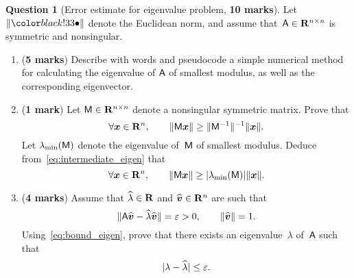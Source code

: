 \documentclass[11pt]{article}
\theoremstyle{definition}
\newtheorem{question}{Question}
\theoremstyle{remark}
\begin{document}


\newpage
\begin{question}
    [Error estimate for eigenvalue problem, \textbf{10 marks}]
    Let $\norm{\placeholder}$ denote the Euclidean norm,
    and assume that~$\mathsf A \in \mathbf R^{n \times n}$ is symmetric and nonsingular.

    \begin{enumerate}
        \item
            (\textbf{5 marks})
            Describe with words and pseudocode a simple numerical method for calculating the eigenvalue of $\mathsf A$ of smallest modulus,
            as well as the corresponding eigenvector.

        \item
            (\textbf{1 mark})
            Let $\mathsf M \in \mathbf R^{n \times n}$ denote a nonsingular symmetric matrix.
            Prove that
            \begin{equation}
                \label{eq:intermediate_eigen}
                \forall \mathbf{\boldsymbol{x}} \in \mathbf R^n, \qquad
                \lVert\mathsf M \mathbf{\boldsymbol{x}}\rVert \geq \lVert\mathsf M^{-1}\rVert^{-1} \lVert\mathbf{\boldsymbol{x}}\rVert.
            \end{equation}
            Let $\lambda_{\min}(\mathsf M)$ denote the eigenvalue of~$\mathsf M$ of smallest modulus.
            Deduce from~\eqref{eq:intermediate_eigen} that
            \begin{equation}
                \label{eq:bound_eigen}
                \forall \mathbf{\boldsymbol{x}} \in \mathbf R^n, \qquad
                \lVert\mathsf M \mathbf{\boldsymbol{x}}\rVert \geq \lvert\lambda_{\min}(\mathsf M)\rvert \lVert\mathbf{\boldsymbol{x}}\rVert.
            \end{equation}

        \item
            (\textbf{4 marks})
            Assume that $\widehat \lambda \in \mathbf R$ and $\widehat{\mathbf{\boldsymbol{v}}} \in \mathbf R^n$ are such that
            \begin{equation}
                \label{eq:bound}
                \lVert\mathsf A \widehat{\mathbf{\boldsymbol{v}}} - \widehat{\lambda} \widehat{\mathbf{\boldsymbol{v}}}\rVert = \varepsilon > 0,
                \qquad \lVert\widehat {\mathbf{\boldsymbol{v}}}\rVert = 1.
            \end{equation}
            Using~\eqref{eq:bound_eigen},
            prove that there exists an eigenvalue~$\lambda$ of~$\mathsf A$ such that
            \[
                \lvert\lambda - \widehat \lambda\rvert \leq \varepsilon.
            \]


\end{enumerate}
\end{question}
\end{document}

